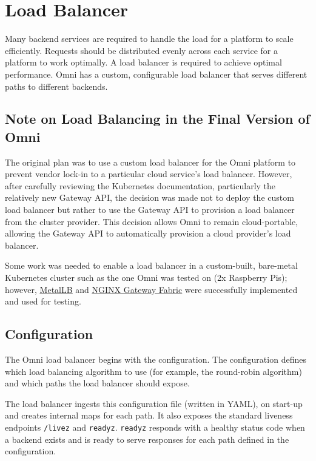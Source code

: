 \section{Load Balancer}
Many backend services are required to handle the load for a platform to scale efficiently.
Requests should be distributed evenly across each service for a platform to work optimally. A load balancer is required to achieve optimal performance.
Omni has a custom, configurable load balancer that serves different paths to different backends.

\subsection{Note on Load Balancing in the Final Version of Omni}
The original plan was to use a custom load balancer for the Omni platform to prevent vendor lock-in to a particular cloud service's load balancer.
However, after carefully reviewing the Kubernetes documentation, particularly the relatively new Gateway API, the decision was made not to deploy the custom load balancer but rather to use the Gateway API to provision a load balancer from the cluster provider.
This decision allows Omni to remain cloud-portable, allowing the Gateway API to automatically provision a cloud provider's load balancer. 

Some work was needed to enable a load balancer in a custom-built, bare-metal Kubernetes cluster such as the one Omni was tested on (2x Raspberry Pis); however, \underline{\href{https://metallb.io}{MetalLB}} \nocite{metallb} and \underline{\href{https://docs.nginx.com/nginx-gateway-fabric/}{NGINX Gateway Fabric}} \nocite{nginxgatewayfabric} were successfully implemented and used for testing.

\subsection{Configuration}
The Omni load balancer begins with the configuration. The configuration defines which load balancing algorithm to use (for example, the round-robin algorithm) and which paths the load balancer should expose. 

The load balancer ingests this configuration file (written in YAML), on start-up and creates internal maps for each path.
It also exposes the standard liveness endpoints \verb|/livez| and \verb|readyz|. \verb|readyz| responds with a healthy status code when a backend exists and is ready to serve responses for each path defined in the configuration.

